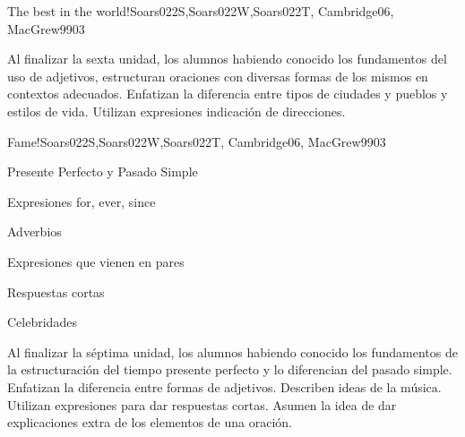 \begin{syllabus}
\begin{unit}{The best in the world!}{Soars022S,Soars022W,Soars022T, Cambridge06, MacGrew99}{0}{3}
   \begin{unitgoals}
      \item Al finalizar la sexta unidad, los alumnos habiendo conocido los fundamentos del uso de adjetivos, estructuran oraciones con diversas formas de los mismos en contextos adecuados. Enfatizan la diferencia entre tipos de ciudades y pueblos y estilos de vida. Utilizan expresiones indicación de direcciones.
   \end{unitgoals}

\end{unit}

\begin{unit}{Fame!}{Soars022S,Soars022W,Soars022T, Cambridge06, MacGrew99}{0}{3}
   \begin{topics}
      \item Presente Perfecto y Pasado Simple
      \item Expresiones for, ever, since
      \item Adverbios
      \item Expresiones que vienen en pares 
      \item Respuestas cortas
      \item Celebridades
   \end{topics}

   \begin{unitgoals}
      \item Al finalizar la séptima unidad, los alumnos habiendo conocido los fundamentos de la estructuración del tiempo presente perfecto y lo diferencian del pasado simple. Enfatizan la diferencia entre formas de adjetivos. Describen ideas de la música. Utilizan expresiones para dar respuestas cortas. Asumen la idea de dar explicaciones extra de los elementos de una oración.
   \end{unitgoals}
\end{unit}



\begin{coursebibliography}
\end{coursebibliography}

\end{syllabus}
%
